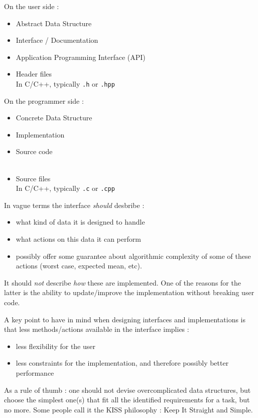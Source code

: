 \documentclass[12pt]{article}
\theoremstyle{plain}
\theoremstyle{remark}
\begin{document}
\begin{center}
	\begin{minipage}[t]{0.45\textwidth}
	On the user side :
	\begin{itemize}
		\item Abstract Data Structure
		\item Interface / Documentation
		\item Application Programming Interface (API)
		\item Header files\\
			In C/C++, typically {\tt .h} or {\tt .hpp}
	\end{itemize}
\end{minipage}
	\begin{minipage}[t]{0.45\textwidth}
	On the programmer side :
	\begin{itemize}
		\item Concrete Data Structure
		\item Implementation
		\item Source code\\\mbox{ }
		\item Source files\\In C/C++, typically {\tt .c} or {\tt .cpp}
	\end{itemize}
\end{minipage}
\end{center}

In vague terms the interface {\it should} desbribe : 
\begin{itemize}
	\item what kind of data it is designed to handle
	\item what actions on this data it can perform
	\item possibly offer some guarantee about algorithmic complexity of
		some of these actions (worst case, expected mean, etc).
\end{itemize}

It should {\it not} describe {\it how} these are implemented. One of the reasons
for the latter is the ability to update/improve the implementation without
breaking user code.

\medskip

A key point to have in mind when designing interfaces and implementations is
that less methods/actions available in the interface implies :
\begin{itemize}
	\item less flexibility for the user
	\item less constraints for the implementation, and therefore possibly
		better performance
\end{itemize}
As a rule of thumb : one should not devise overcomplicated data structures, but
choose the simplest one(s) that fit all the identified requirements for a task,
but no more. Some people call it the KISS philosophy : Keep It Straight and
Simple.
\end{document}
